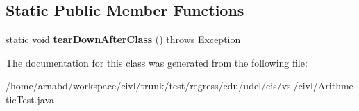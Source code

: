 \subsection*{Static Public Member Functions}
\begin{DoxyCompactItemize}
\item 
\hypertarget{classedu_1_1udel_1_1cis_1_1vsl_1_1civl_1_1ArithmeticTest_afe2a34142a71659a7b23796dae93c254}{}static void {\bfseries tear\+Down\+After\+Class} ()  throws Exception \label{classedu_1_1udel_1_1cis_1_1vsl_1_1civl_1_1ArithmeticTest_afe2a34142a71659a7b23796dae93c254}

\end{DoxyCompactItemize}


The documentation for this class was generated from the following file\+:\begin{DoxyCompactItemize}
\item 
/home/arnabd/workspace/civl/trunk/test/regress/edu/udel/cis/vsl/civl/Arithmetic\+Test.\+java\end{DoxyCompactItemize}
